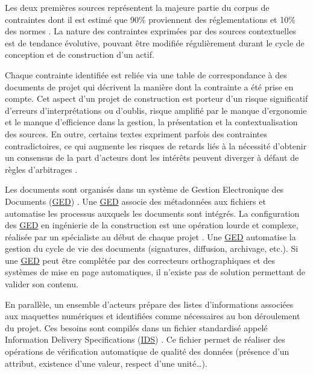\documentclass[a4paper,12pt]{article}
\begin{document}
Les deux premières sources représentent la majeure partie du corpus de contraintes dont il est estimé que 90\% proviennent des réglementations et 10\% des normes \autocite{baudetTropNormesAFNOR2024}. La nature des contraintes exprimées par des sources contextuelles est de tendance évolutive, pouvant être modifiée régulièrement durant le cycle de conception et de construction d’un actif.

Chaque contrainte identifiée est reliée via une table de correspondance à des documents de projet qui décrivent la manière dont la contrainte a été prise en compte. Cet aspect d’un projet de construction est porteur d’un risque significatif d'erreurs d'interprétations ou d'oublis,  risque amplifié par le manque d'ergonomie et le manque d'efficience dans la gestion, la présentation et la contextualisation des sources. En outre, certains textes expriment parfois des contraintes contradictoires, ce qui augmente les risques de retards liés à la nécessité d’obtenir un consensus de la part d’acteurs dont les intérêts peuvent diverger  à défaut de règles d’arbitrages \autocite{EntryForceEuropean2024a,robertorodriguezCoherenceOuContradiction2022}.

Les documents sont organisés dans un système de Gestion Electronique des Documents
 (\protect\hyperlink{gls-7}{\label{gls-7-use-1}GED}) \autocite{pimoMisePlaceSolutions2021a}. Une \protect\hyperlink{gls-7}{\label{gls-7-use-2}GED} associe des  métadonnées aux fichiers et automatise les processus auxquels les documents sont intégrés. La configuration des \protect\hyperlink{gls-7}{\label{gls-7-use-3}GED} en ingénierie de la construction est une opération lourde et complexe, réalisée par un spécialiste au début de chaque projet \autocite{bjorkElectronicDocumentManagement2006a}. Une \protect\hyperlink{gls-7}{\label{gls-7-use-4}GED}  automatise la gestion du cycle de vie des documents (signatures, diffusion, archivage, etc.). Si une \protect\hyperlink{gls-7}{\label{gls-7-use-5}GED} peut être complétée par des correcteurs orthographiques et des systèmes de mise en page automatiques, il n'existe pas de solution permettant de valider son contenu.

En parallèle, un ensemble d’acteurs prépare des listes d’informations associées aux maquettes numériques et identifiées comme nécessaires au bon déroulement du projet. Ces besoins sont compilés dans un fichier standardisé appelé Information Delivery Specifications
 (\protect\hyperlink{gls-8}{\label{gls-8-use-1}IDS}) \autocite{InformationDeliverySpecification2024a}. Ce fichier permet de réaliser des opérations de vérification automatique de qualité des données (présence d’un attribut, existence d’une valeur, respect d’une unité…).
\end{document}
